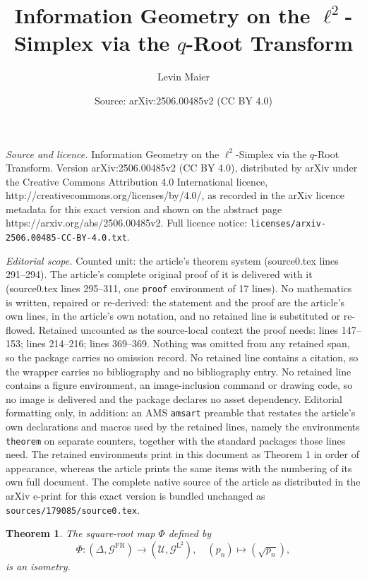 \documentclass[10pt,a4paper]{amsart}
\title{Information Geometry on the $\ell^2$-Simplex via the $q$-Root Transform}
\author{Levin Maier}
\date{Source: arXiv:2506.00485v2 (CC BY 4.0)}
\newtheorem{theorem}{Theorem}
\begin{document}
\maketitle

\noindent\emph{Source and licence.} Information Geometry on the $\ell^2$-Simplex via the $q$-Root Transform. Version arXiv:2506.00485v2 (CC BY 4.0), distributed by arXiv under the Creative Commons Attribution 4.0 International licence, http://creativecommons.org/licenses/by/4.0/, as recorded in the arXiv licence metadata for this exact version and shown on the abstract page https://arxiv.org/abs/2506.00485v2. Full licence notice: \texttt{licenses/arxiv-2506.00485-CC-BY-4.0.txt}.\par\smallskip

\noindent\textit{Editorial scope.} Counted unit: the article's theorem system (source0.tex lines 291--294). The article's complete original proof of it is delivered with it (source0.tex lines 295--311, one \texttt{proof} environment of 17 lines). No mathematics is written, repaired or re-derived: the statement and the proof are the article's own lines, in the article's own notation, and no retained line is substituted or re-flowed.  Retained uncounted as the source-local context the proof needs: lines 147--153; lines 214--216; lines 369--369.  Nothing was omitted from any retained span, so the package carries no omission record.  No retained line contains a citation, so the wrapper carries no bibliography and no bibliography entry.  No retained line contains a figure environment, an image-inclusion command or drawing code, so no image is delivered and the package declares no asset dependency.  Editorial formatting only, in addition: an AMS \texttt{amsart} preamble that restates the article's own declarations and macros used by the retained lines, namely the environments \texttt{theorem} on separate counters, together with the standard packages those lines need.  The retained environments print in this document as Theorem 1 in order of appearance, whereas the article prints the same items with the numbering of its own full document.  The complete native source of the article as distributed in the arXiv e-print for this exact version is bundled unchanged as \texttt{sources/179085/source0.tex}.
\begin{theorem}\label{t: square root map is isometry}
The square-root map \( \varPhi \) defined by
\[
\varPhi: (\Delta, \mathcal{G}^{\mathrm{FR}}) \longrightarrow (\mathcal{U}, \mathcal{G}^{\mathrm{L}^2}), \quad (p_n) \mapsto (\sqrt{p_n}),
\]
is an isometry.
\end{theorem}
\end{document}
